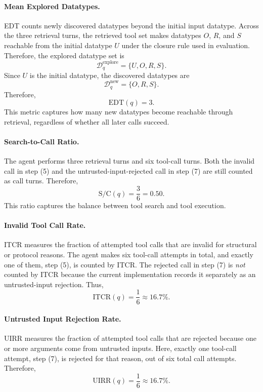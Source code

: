 \documentclass{llmxive}
\begin{document}
\paragraph{Mean Explored Datatypes.}
EDT counts newly discovered datatypes beyond the initial input datatype.
Across the three retrieval turns, the retrieved tool set makes datatypes $O$, $R$, and $S$ reachable from the initial datatype $U$ under the closure rule used in evaluation.
Therefore, the explored datatype set is
\begin{equation}
\mathcal{D}^{\mathrm{explore}}_q = \{U,O,R,S\}.
\end{equation}
Since $U$ is the initial datatype, the discovered datatypes are
\begin{equation}
\mathcal{D}^{\mathrm{new}}_q = \{O,R,S\}.
\end{equation}
Therefore,
\begin{equation}
\mathrm{EDT}(q)=3.
\end{equation}
This metric captures how many new datatypes become reachable through retrieval, regardless of whether all later calls succeed.

\paragraph{Search-to-Call Ratio.}
The agent performs three retrieval turns and six tool-call turns.
Both the invalid call in step (5) and the untrusted-input-rejected call in step (7) are still counted as call turns.
Therefore,
\begin{equation}
\mathrm{S/C}(q)=\frac{3}{6}=0.50.
\end{equation}
This ratio captures the balance between tool search and tool execution.

\paragraph{Invalid Tool Call Rate.}
ITCR measures the fraction of attempted tool calls that are invalid for structural or protocol reasons. 
The agent makes six tool-call attempts in total, and exactly one of them, step (5), is counted by ITCR.
The rejected call in step (7) is \emph{not} counted by ITCR because the current implementation records it separately as an untrusted-input rejection.
Thus,
\begin{equation}
\mathrm{ITCR}(q)=\frac{1}{6}\approx 16.7\%.
\end{equation}

\paragraph{Untrusted Input Rejection Rate.}
UIRR measures the fraction of attempted tool calls that are rejected because one or more arguments come from untrusted inputs. 
Here, exactly one tool-call attempt, step (7), is rejected for that reason, out of six total call attempts.
Therefore,
\begin{equation}
\mathrm{UIRR}(q)=\frac{1}{6}\approx 16.7\%.
\end{equation}
\end{document}
